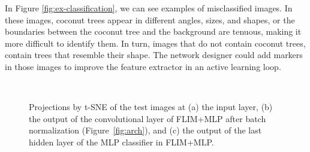 \documentclass[journal, twoside]{IEEEtran}
\begin{document}
 In Figure \ref{fig:ex-classification}, we can see examples of misclassified images. In these images, coconut trees appear in different angles, sizes, and shapes, or the boundaries between the coconut tree and the background are tenuous, making it more difficult to identify them. In turn, images that do not contain coconut trees, contain trees that resemble their shape. The network designer could add markers in those images to improve the feature extractor in an active learning loop.

\begin{figure}
  \centering
  ~
  ~
  \caption{Projections by t-SNE of the test images at (a) the input layer, (b) the output of the convolutional layer of  FLIM+MLP after batch normalization (Figure~\ref{fig:arch}), and (c) the output of the last hidden layer of the MLP classifier in  FLIM+MLP.}
\end{figure}
\end{document}
